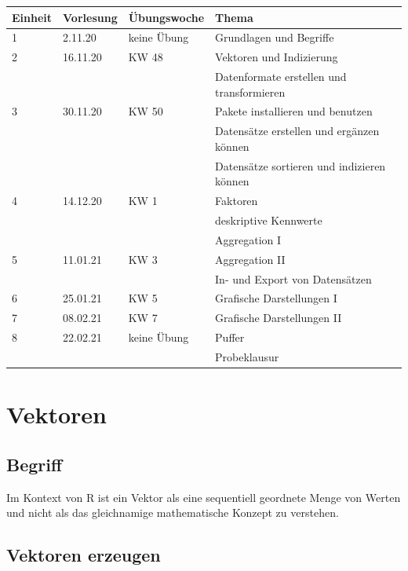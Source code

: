 \documentclass[
]{book}
\begin{document}
\begin{table}[H]
\centering\begingroup\fontsize{15}{17}\selectfont

\begin{tabular}{l|l|l|l}
\hline
Einheit & Vorlesung & Übungswoche & Thema\\
\hline
1 & 2.11.20 & keine Übung & Grundlagen und Begriffe\\
\hline
2 & 16.11.20 & KW 48 & Vektoren und Indizierung\\
\hline
 &  &  & Datenformate erstellen und transformieren\\
\hline
3 & 30.11.20 & KW 50 & Pakete installieren und benutzen\\
\hline
 &  &  & Datensätze erstellen und ergänzen können\\
\hline
 &  &  & Datensätze sortieren und indizieren können\\
\hline
4 & 14.12.20 & KW 1 & Faktoren\\
\hline
 &  &  & deskriptive Kennwerte\\
\hline
 &  &  & Aggregation I\\
\hline
5 & 11.01.21 & KW 3 & Aggregation II\\
\hline
 &  &  & In- und Export von Datensätzen\\
\hline
6 & 25.01.21 & KW 5 & Grafische Darstellungen I\\
\hline
7 & 08.02.21 & KW 7 & Grafische Darstellungen II\\
\hline
8 & 22.02.21 & keine Übung & Puffer\\
\hline
 &  &  & Probeklausur\\
\hline
\end{tabular}
\endgroup{}
\end{table}

\hypertarget{vektoren}{%
\section{Vektoren}\label{vektoren}}

\hypertarget{begriff}{%
\subsection{Begriff}\label{begriff}}

Im Kontext von R ist ein Vektor als eine sequentiell geordnete Menge von Werten und nicht als das gleichnamige mathematische Konzept zu verstehen.

\hypertarget{vektoren-erzeugen}{%
\subsection{Vektoren erzeugen}\label{vektoren-erzeugen}}
\end{document}
